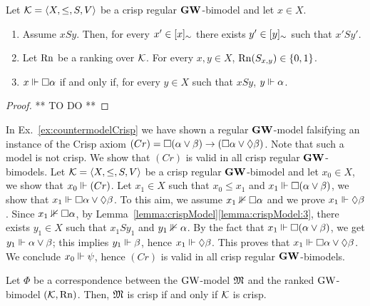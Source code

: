 \begin{lemma}\label{lemma:crispModel}
  Let $\mathcal{K}=\langle X,\leq,S,V \rangle$ be a crisp regular $\mathbf{GW}$-bimodel and let  $x\in X$.

   \begin{enumerate}[label=(\roman*), ref=(\roman*),leftmargin=*]
   \item\label{lemma:crispModel:1}
Assume $x Sy$.  Then,
 for every $x'\in[x]_\sim$ there exists  $y'\in[y]_\sim$ such that $x'S y'$.


\item\label{lemma:crispModel:2} 
Let  $\mathrm{Rn}$ be a ranking over $\mathcal{K}$.  For every $x,y\in X$,  $\mathrm{Rn}(S_{x,y})\in\{0,1\}$.

\item\label{lemma:crispModel:3} 
$x\Vdash \Box \alpha$ if and only if, for every $y\in X$ such that $x S y$, $y\Vdash \alpha$.



\end{enumerate}
\end{lemma}

\begin{proof}
  ** TO DO **
\end{proof}


\begin{example}\label{ex:crispModel}
  In Ex.~\ref{ex:countermodelCrisp} we have shown a regular $\mathbf{GW}$-model falsifying an instance of
  the Crisp axiom $(Cr)=\Box (\alpha\lor \beta)\to (\Box \alpha \lor \lozenge \beta)$. Note that such a model is not crisp.
  We show that $(Cr)$ is valid in all crisp
  regular $\mathbf{GW}$-bimodels.
  Let  $\mathcal{K}=\langle X,\leq,S,V \rangle$ be a crisp regular  $\mathbf{GW}$-bimodel and let $x_0\in X$,
  we show that $x_0\Vdash (Cr)$.
  Let  $x_1\in X$ such that $x_0\leq x_1$ and  $x_1\Vdash \Box (\alpha\lor \beta)$, we show that
  $x_1\Vdash \Box \alpha \lor \lozenge \beta$. To this aim, we assume    $x_1\nVdash \Box \alpha$ and we prove
  $x_1\Vdash  \lozenge \beta$.
 Since    $x_1\nVdash \Box \alpha$,   by Lemma~\ref{lemma:crispModel}\ref{lemma:crispModel:3}, 
  there exists $y_1\in X$ such that  $x_1 S y_1$ and    $y_1\nVdash  \alpha$. By the fact that  $x_1\Vdash \Box (\alpha\lor \beta)$,
  we get $y_1\Vdash \alpha\lor \beta$; this implies $y_1\Vdash \beta$,
  hence  $x_1\Vdash  \lozenge \beta$. This proves that $x_1\Vdash \Box \alpha \lor \lozenge \beta$.
  We conclude $x_0\Vdash \psi$, hence  $(Cr)$ is valid in all crisp  regular $\mathbf{GW}$-bimodels.
\EndEx
\end{example}



\begin{proposition}\label{prop:PhiCrisp}
 Let $\Phi$ be a correspondence between the $\mbox{$\mathrm{GW}$}$-model $\mathfrak{M}$ and  the ranked $\mbox{$\mathrm{GW}$}$-bimodel $(\mathcal{K},\mathrm{Rn})$.
Then, $\mathfrak{M}$ is crisp if and only if $\mathcal{K}$ is crisp.
\end{proposition}



